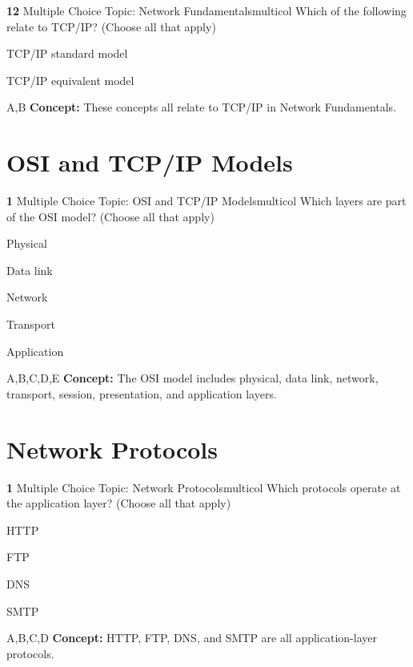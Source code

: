 \documentclass[10pt,a4paper]{article}
\begin{document}
\begin{qcard}{\color{white}\textbf{12} \hfill \small Multiple Choice \textbar{} Topic: Network Fundamentals}{multicol}
Which of the following relate to TCP/IP? (Choose all that apply)

\begin{qoptions}
\item TCP/IP standard model
\item TCP/IP equivalent model
\end{qoptions}
\begin{explainbox}{A,B}
\textbf{Concept:} These concepts all relate to TCP/IP in Network Fundamentals.
\end{explainbox}
\end{qcard}

\section{OSI and TCP/IP Models}
\begin{qcard}{\color{white}\textbf{1} \hfill \small Multiple Choice \textbar{} Topic: OSI and TCP/IP Models}{multicol}
Which layers are part of the OSI model? (Choose all that apply)

\begin{qoptions}
\item Physical
\item Data link
\item Network
\item Transport
\item Application
\end{qoptions}
\begin{explainbox}{A,B,C,D,E}
\textbf{Concept:} The OSI model includes physical, data link, network, transport, session, presentation, and application layers.
\end{explainbox}
\end{qcard}

\section{Network Protocols}
\begin{qcard}{\color{white}\textbf{1} \hfill \small Multiple Choice \textbar{} Topic: Network Protocols}{multicol}
Which protocols operate at the application layer? (Choose all that apply)

\begin{qoptions}
\item HTTP
\item FTP
\item DNS
\item SMTP
\end{qoptions}
\begin{explainbox}{A,B,C,D}
\textbf{Concept:} HTTP, FTP, DNS, and SMTP are all application-layer protocols.
\end{explainbox}
\end{qcard}
\end{document}
